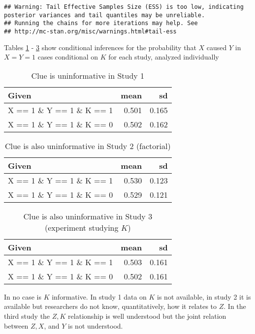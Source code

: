\documentclass[
  12pt,
]{book}
\begin{document}
\begin{verbatim}
## Warning: Tail Effective Samples Size (ESS) is too low, indicating posterior variances and tail quantiles may be unreliable.
## Running the chains for more iterations may help. See
## http://mc-stan.org/misc/warnings.html#tail-ess
\end{verbatim}

Tables \ref{tab:frank1} - \ref{tab:frank3} show conditional inferences for the probability that \(X\) caused \(Y\) in \(X=Y=1\) cases conditional on \(K\) for each study, analyzed individually

\begin{table}

\caption{\label{tab:frank1}Clue is uninformative in Study 1}
\centering
\begin{tabular}[t]{l|r|r}
\hline
Given & mean & sd\\
\hline
X == 1 \& Y == 1 \& K == 1 & 0.501 & 0.165\\
\hline
X == 1 \& Y == 1 \& K == 0 & 0.502 & 0.162\\
\hline
\end{tabular}
\end{table}

\begin{table}

\caption{\label{tab:frank2}Clue is also uninformative in Study 2 (factorial)}
\centering
\begin{tabular}[t]{l|r|r}
\hline
Given & mean & sd\\
\hline
X == 1 \& Y == 1 \& K == 1 & 0.530 & 0.123\\
\hline
X == 1 \& Y == 1 \& K == 0 & 0.529 & 0.121\\
\hline
\end{tabular}
\end{table}

\begin{table}

\caption{\label{tab:frank3}Clue is also uninformative in Study 3 (experiment studying $K$)}
\centering
\begin{tabular}[t]{l|r|r}
\hline
Given & mean & sd\\
\hline
X == 1 \& Y == 1 \& K == 1 & 0.503 & 0.161\\
\hline
X == 1 \& Y == 1 \& K == 0 & 0.502 & 0.161\\
\hline
\end{tabular}
\end{table}

In no case is \(K\) informative. In study 1 data on \(K\) is not available, in study 2 it is available but researchers do not know, quantitatively, how it relates to \(Z\). In the third study the \(Z,K\) relationship is well understood but the joint relation between \(Z,X\), and \(Y\) is not understood.
\end{document}
